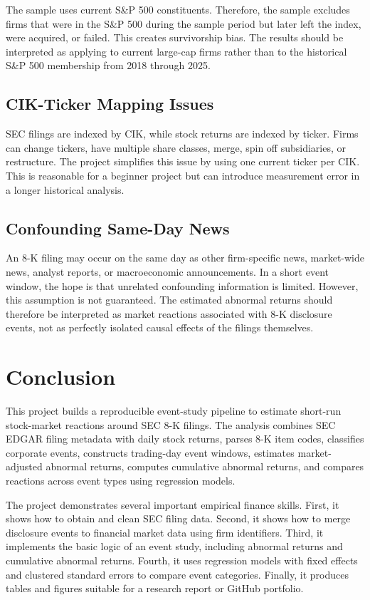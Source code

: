 \documentclass[12pt]{article}
\begin{document}
	The sample uses current S\&P 500 constituents. Therefore, the sample excludes firms that were in the S\&P 500 during the sample period but later left the index, were acquired, or failed. This creates survivorship bias. The results should be interpreted as applying to current large-cap firms rather than to the historical S\&P 500 membership from 2018 through 2025.
	
	\subsection{CIK-Ticker Mapping Issues}
	
	SEC filings are indexed by CIK, while stock returns are indexed by ticker. Firms can change tickers, have multiple share classes, merge, spin off subsidiaries, or restructure. The project simplifies this issue by using one current ticker per CIK. This is reasonable for a beginner project but can introduce measurement error in a longer historical analysis.
	
	\subsection{Confounding Same-Day News}
	
	An 8-K filing may occur on the same day as other firm-specific news, market-wide news, analyst reports, or macroeconomic announcements. In a short event window, the hope is that unrelated confounding information is limited. However, this assumption is not guaranteed. The estimated abnormal returns should therefore be interpreted as market reactions associated with 8-K disclosure events, not as perfectly isolated causal effects of the filings themselves.
	
	\section{Conclusion}
	
	This project builds a reproducible event-study pipeline to estimate short-run stock-market reactions around SEC 8-K filings. The analysis combines SEC EDGAR filing metadata with daily stock returns, parses 8-K item codes, classifies corporate events, constructs trading-day event windows, estimates market-adjusted abnormal returns, computes cumulative abnormal returns, and compares reactions across event types using regression models.
	
	The project demonstrates several important empirical finance skills. First, it shows how to obtain and clean SEC filing data. Second, it shows how to merge disclosure events to financial market data using firm identifiers. Third, it implements the basic logic of an event study, including abnormal returns and cumulative abnormal returns. Fourth, it uses regression models with fixed effects and clustered standard errors to compare event categories. Finally, it produces tables and figures suitable for a research report or GitHub portfolio.
	
\end{document}
